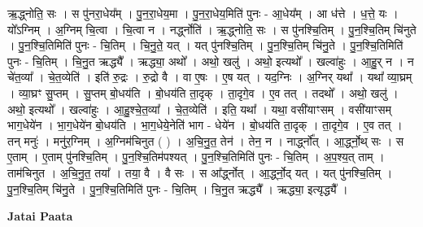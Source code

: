 \documentclass[17pt]{extarticle}
\begin{document}
ऋ॒द्ध्नोति॒ सः । स पु॑नरा॒धेय᳚म् । पु॒न॒रा॒धेय॒मा । पु॒न॒रा॒धेय॒मिति॑ पुनः - आ॒धेय᳚म् । आ ध॑त्ते । ध॒त्ते॒ यः । यो᳚ऽग्निम् । अ॒ग्निम् चि॒त्वा । चि॒त्वा न । नर्द्ध्नोति॑ । ऋ॒द्ध्नोति॒ सः । स पु॑नश्चि॒तिम् । पु॒न॒श्चि॒तिम् चि॑नुते । पु॒न॒श्चि॒तिमिति॑ पुनः - चि॒तिम् । चि॒नु॒ते॒ यत् । यत् पु॑नश्चि॒तिम् । पु॒न॒श्चि॒तिम् चि॑नु॒ते । पु॒न॒श्चि॒तिमिति॑ पुनः - चि॒तिम् । चि॒नु॒त ऋद्ध्यै᳚ । ऋद्ध्या॒ अथो᳚ । अथो॒ खलु॑ । अथो॒ इत्यथो᳚ । खल्वा॑हुः । आ॒हु॒र् न । न चे॑त॒व्या᳚ । चे॒त॒व्येति॑ । इति॑ रु॒द्रः । रु॒द्रो वै । वा ए॒षः । ए॒ष यत् । यद॒ग्निः । अ॒ग्निर् यथा᳚ । यथा᳚ व्या॒घ्रम् । व्या॒घ्रꣳ सु॒प्तम् । सु॒प्तम् बो॒धय॑ति । बो॒धय॑ति ता॒दृक् । ता॒दृगे॒व । ए॒व तत् । तदथो᳚ । अथो॒ खलु॑ । अथो॒ इत्यथो᳚ । खल्वा॑हुः । आ॒हु॒श्चे॒त॒व्या᳚ । चे॒त॒व्येति॑ । इति॒ यथा᳚ । यथा॒ वसी॑याꣳसम् । वसी॑याꣳसम् भाग॒धेये॑न । भा॒ग॒धेये॑न बो॒धय॑ति । भा॒ग॒धेये॒नेति॑ भाग - धेये॑न । बो॒धय॑ति ता॒दृक् । ता॒दृगे॒व । ए॒व तत् । तन् मनुः॑ । मनु॑र॒ग्निम् । अ॒ग्निम॑चिनुत ( ) । अ॒चि॒नु॒त॒ तेन॑ । तेन॒ न । नार्द्ध्नो᳚त् । आ॒र्द्ध्नो॒थ् सः । स ए॒ताम् । ए॒ताम् पु॑नश्चि॒तिम् । पु॒न॒श्चि॒तिम॑पश्यत् । पु॒न॒श्चि॒तिमिति॑ पुनः - चि॒तिम् । अ॒प॒श्य॒त् ताम् । ताम॑चिनुत । अ॒चि॒नु॒त॒ तया᳚ । तया॒ वै । वै सः । स आ᳚र्द्ध्नोत् । आ॒र्द्ध्नो॒द् यत् । यत् पु॑नश्चि॒तिम् । पु॒न॒श्चि॒तिम् चि॑नु॒ते । पु॒न॒श्चि॒तिमिति॑ पुनः - चि॒तिम् । चि॒नु॒त ऋद्ध्यै᳚ । ऋद्ध्या॒ इत्यृद्ध्यै᳚ । \newline

\textbf{Jatai Paata} \newline
\end{document}
